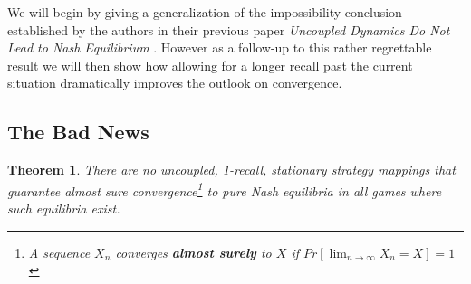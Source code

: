 \documentclass[a4paper]{article}
\theoremstyle{plain}
\newtheorem{theorem}{Theorem}
\theoremstyle{remark}
\begin{document}

We will begin by giving a generalization of the impossibility conclusion established
by the authors in their previous paper \emph{Uncoupled Dynamics Do Not Lead to Nash Equilibrium}
\cite{prevpaper}.
However as a follow-up to this rather regrettable result we will then show how allowing for
a longer recall past the current situation dramatically improves the outlook on convergence.

\subsection{The Bad News}

\begin{theorem}
  There are no uncoupled, 1-recall, stationary strategy mappings that guarantee almost sure
  convergence\footnote{A sequence $X_n$ converges {\bf almost surely} to $X$ if $Pr[\lim_{n \to \infty} X_n = X] = 1$} to pure Nash equilibria in all games where such equilibria exist.
\end{theorem}
\end{document}

